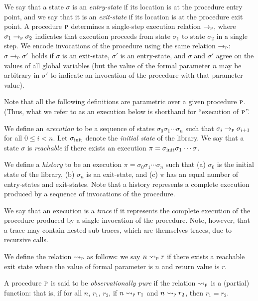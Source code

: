 We say that a state $\sigma$ is an \emph{entry-state} if its location is at the procedure entry point,
and we say that it is an \emph{exit-state} if its location is at the procedure exit point.
A procedure $\textsc{p}$ determines a single-step execution relation $\rightarrow_{\textsc{p}}$, where $\sigma_1 \rightarrow_{\textsc{p}} \sigma_2$ indicates
that execution proceeds from state $\sigma_1$ to state $\sigma_2$ in a single step.
We encode invocations of the procedure using the same relation $\rightarrow_{\textsc{p}}$: 
$\sigma \rightarrow_{\textsc{p}} \sigma'$  holds if $\sigma$ is an exit-state, $\sigma'$ is an entry-state,
and $\sigma$ and $\sigma'$ agree on the values of all global variables (but the value of the formal
parameter $n$ may be arbitrary in $\sigma'$ to indicate an invocation of the procedure with that
parameter value).

Note that all the following definitions are parametric over a given procedure $\textsc{p}$.
(Thus, what we refer to as an execution below is shorthand for ``execution of $\textsc{p}$''.

We define an \emph{execution} to be a sequence of states $\sigma_0 \sigma_1 \cdots \sigma_n$ such that
$\sigma_i \rightarrow_{\textsc{p}} \sigma_{i+1}$ for all $0 \leq i < n$.
Let $\sigma_{\text{init}}$ denote the \emph{initial state} of the library.
We say that a state $\sigma$ is \emph{ reachable} if there exists an execution $\pi = \sigma_{\text{init}} \sigma_1 \cdots \sigma$.

We define a \emph{history} to be an execution $\pi = \sigma_0 \sigma_1 \cdots \sigma_n$ such that
(a) $\sigma_0$ is the initial state of the library,
(b) $\sigma_n$ is an exit-state, and
(c) $\pi$ has an equal number of entry-states and exit-states.
Note that a history represents a complete  execution produced by a
sequence of invocations of the procedure.

We say that an execution is a \emph{trace} if it represents the complete execution
of the procedure produced by a single invocation of the procedure.
Note, however, that a trace may contain nested sub-traces,
which are themselves traces, due to recursive calls.

We define the relation $\rightsquigarrow_{\textsc{p}}$ as follows:
we say $n \rightsquigarrow_{\textsc{p}} r$ if there exists a reachable exit state where the value of formal
parameter is $n$ and return value is $r$.

\begin{definition}
A procedure $\textsc{p}$ is said to be \emph{observationally pure} if the relation $\rightsquigarrow_{\textsc{p}}$ is a (partial) function:
that is, if for all $n$, $r_1$, $r_2$, if  $n \rightsquigarrow_{\textsc{p}} r_1$ and $n \rightsquigarrow_{\textsc{p}} r_2$, then $r_1 = r_2$.
\end{definition}

